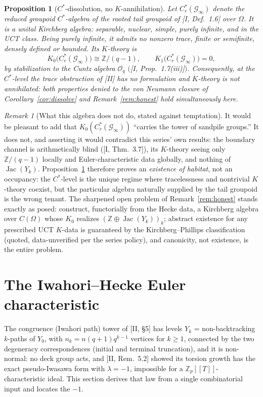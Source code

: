 \documentclass[11pt]{amsart}
\numberwithin{equation}{section}
\newtheorem{proposition}[theorem]{Proposition}
\theoremstyle{definition}
\theoremstyle{remark}
\newtheorem{remark}[theorem]{Remark}
\newcommand{\Z}{\mathbb{Z}}
\newcommand{\cG}{\mathcal{G}}
\newcommand{\Jac}{\operatorname{Jac}}
\begin{document}
\begin{proposition}[$C^*$-dissolution, no $K$-annihilation]\label{prop:kirchberg}
Let $C^*_r(\cG_\infty)$ denote the reduced groupoid $C^*$-algebra of the rooted tail
groupoid of [I, Def.~1.6] over $\Omega$. It is a unital Kirchberg algebra: separable,
nuclear, simple, purely infinite, and in the UCT class. Being purely infinite, it
admits no nonzero trace, finite or semifinite, densely defined or bounded. Its $K$-theory is
\[
K_0\bigl(C^*_r(\cG_\infty)\bigr)\cong\Z/(q-1),\qquad
K_1\bigl(C^*_r(\cG_\infty)\bigr)=0,
\]
by stabilization to the Cuntz algebra $\mathcal O_q$ $($[I, Prop.~1.7(iii)]$)$.
Consequently, at the $C^*$-level the trace obstruction of [II] has no formulation
\emph{and} $K$-theory is not annihilated: both properties denied to the von Neumann
closure of Corollary~\ref{cor:dissolve} and Remark~\ref{rem:honest} hold
simultaneously here.
\end{proposition}

\begin{remark}[What this algebra does not do, stated against temptation]
\label{rem:blindagain}
It would be pleasant to add that $K_0(C^*_r(\cG_\infty))$ ``carries the tower of
sandpile groups.'' It does not, and asserting it would contradict this series' own
results: the boundary channel is arithmetically blind ([I, Thm.~3.7]), its $K$-theory
seeing only $\Z/(q-1)$ locally and Euler-characteristic data globally, and nothing of
$\Jac(Y_k)$. Proposition~\ref{prop:kirchberg} therefore proves an \emph{existence of
habitat}, not an occupancy: the $C^*$-level is the unique regime where tracelessness
and nontrivial $K$-theory coexist, but the particular algebra naturally supplied by
the tail groupoid is the wrong tenant. The sharpened open problem of
Remark~\ref{rem:honest} stands exactly as posed: construct, functorially from the
Hecke data, a Kirchberg algebra over $C(\Omega)$ whose $K_0$ realizes
$(\Z\oplus\Jac(Y_k))_k$; abstract existence for any prescribed UCT $K$-data is
guaranteed by the Kirchberg--Phillips classification (quoted, data-unverified per the
series policy), and canonicity, not existence, is the entire problem.
\end{remark}

\section{The Iwahori--Hecke Euler characteristic}\label{sec:euler}

The congruence (Iwahori path) tower of [II, \S5] has levels
$Y_k$ = non-backtracking $k$-paths of $Y_0$, with $n_k=n(q+1)q^{k-1}$ vertices for
$k\ge1$, connected by the two degeneracy correspondences (initial and terminal
truncation), and it is non-normal: no deck group acts, and [II, Rem.~5.2] showed its
torsion growth has the exact pseudo-Iwasawa form with $\lambda=-1$, impossible for a
$\Z_p[[T]]$-characteristic ideal. This section derives that law from a single
combinatorial input and locates the $-1$.
\end{document}
